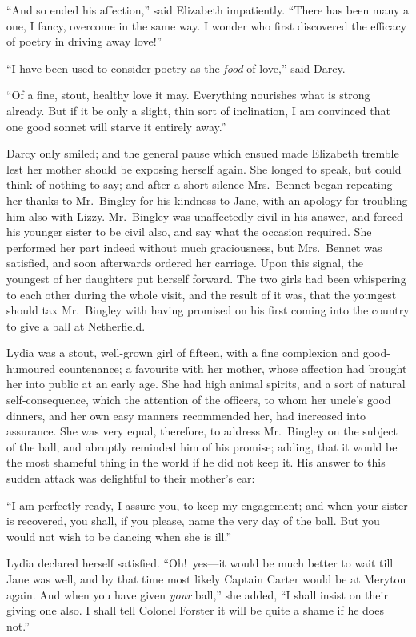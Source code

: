 \documentclass[12pt,english]{book}
\begin{document}
{}``And so ended his affection,'' said Elizabeth impatiently. {}``There
has been many a one, I fancy, overcome in the same way. I wonder who
first discovered the efficacy of poetry in driving away love!''\ 

{}``I have been used to consider poetry as the \textit{food} of love,''
said Darcy.

{}``Of a fine, stout, healthy love it may. Everything nourishes what
is strong already. But if it be only a slight, thin sort of inclination,
I am convinced that one good sonnet will starve it entirely away.''

Darcy only smiled; and the general pause which ensued made Elizabeth
tremble lest her mother should be exposing herself again. She longed
to speak, but could think of nothing to say; and after a short silence
Mrs.\ Bennet began repeating her thanks to Mr.\ Bingley for his
kindness to Jane, with an apology for troubling him also with Lizzy.
Mr.\ Bingley was unaffectedly civil in his answer, and forced his
younger sister to be civil also, and say what the occasion required.
She performed her part indeed without much graciousness, but Mrs.\ Bennet
was satisfied, and soon afterwards ordered her carriage. Upon this
signal, the youngest of her daughters put herself forward. The two
girls had been whispering to each other during the whole visit, and
the result of it was, that the youngest should tax Mr.\ Bingley with
having promised on his first coming into the country to give a ball
at Netherfield.

Lydia was a stout, well-grown girl of fifteen, with a fine complexion
and good-humoured countenance; a favourite with her mother, whose
affection had brought her into public at an early age. She had high
animal spirits, and a sort of natural self-consequence, which the
attention of the officers, to whom her uncle's good dinners, and her
own easy manners recommended her, had increased into assurance. She
was very equal, therefore, to address Mr.\ Bingley on the subject
of the ball, and abruptly reminded him of his promise; adding, that
it would be the most shameful thing in the world if he did not keep
it. His answer to this sudden attack was delightful to their mother's
ear:

{}``I am perfectly ready, I assure you, to keep my engagement; and
when your sister is recovered, you shall, if you please, name the
very day of the ball. But you would not wish to be dancing when she
is ill.''

Lydia declared herself satisfied. {}``Oh!\ yes\mbox{---}it would
be much better to wait till Jane was well, and by that time most likely
Captain Carter would be at Meryton again. And when you have given
\textit{your} ball,'' she added, {}``I shall insist on their giving
one also. I shall tell Colonel Forster it will be quite a shame if
he does not.''
\end{document}
